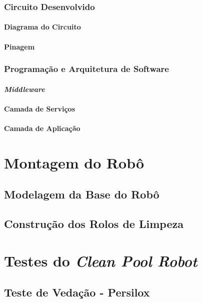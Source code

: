     \subsection{Circuito Desenvolvido}
      \subsubsection{Diagrama do Circuito}
      \subsubsection{Pinagem}
    \subsection{Programação e Arquitetura de Software}
      \subsubsection{\textit{Middleware}}
      \subsubsection{Camada de Serviços}
      \subsubsection{Camada de Aplicação}
  
\chapter{Montagem do Robô}
  \section{Modelagem da Base do Robô}
  \section{Construção dos Rolos de Limpeza}

\chapter{Testes do \textit{Clean Pool Robot}}
  \section{Teste de Vedação - Persilox}
